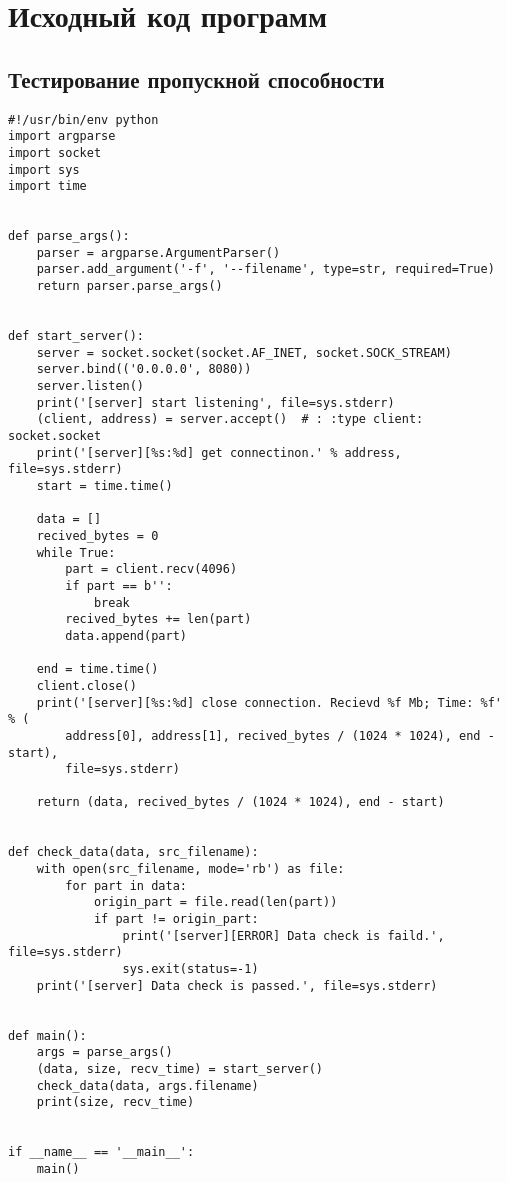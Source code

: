 \chapter{Исходный код программ}
\label{cha:appendix2}



\section{Тестирование пропускной способности}

\begin{verbatim}
#!/usr/bin/env python
import argparse
import socket
import sys
import time


def parse_args():
    parser = argparse.ArgumentParser()
    parser.add_argument('-f', '--filename', type=str, required=True)
    return parser.parse_args()


def start_server():
    server = socket.socket(socket.AF_INET, socket.SOCK_STREAM)
    server.bind(('0.0.0.0', 8080))
    server.listen()
    print('[server] start listening', file=sys.stderr)
    (client, address) = server.accept()  # : :type client: socket.socket
    print('[server][%s:%d] get connectinon.' % address, file=sys.stderr)
    start = time.time()

    data = []
    recived_bytes = 0
    while True:
        part = client.recv(4096)
        if part == b'':
            break
        recived_bytes += len(part)
        data.append(part)

    end = time.time()
    client.close()
    print('[server][%s:%d] close connection. Recievd %f Mb; Time: %f' % (
        address[0], address[1], recived_bytes / (1024 * 1024), end - start),
        file=sys.stderr)

    return (data, recived_bytes / (1024 * 1024), end - start)


def check_data(data, src_filename):
    with open(src_filename, mode='rb') as file:
        for part in data:
            origin_part = file.read(len(part))
            if part != origin_part:
                print('[server][ERROR] Data check is faild.', file=sys.stderr)
                sys.exit(status=-1)
    print('[server] Data check is passed.', file=sys.stderr)


def main():
    args = parse_args()
    (data, size, recv_time) = start_server()
    check_data(data, args.filename)
    print(size, recv_time)


if __name__ == '__main__':
    main()
\end{verbatim}


